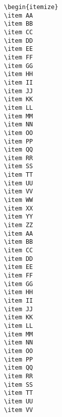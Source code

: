 \documentclass{article}
\begin{document}
\newcommand{\twoline}{\noindent\makebox[\linewidth]{\rule{\textwidth}{0.4pt}}\\}

\begin{verbatim}
\begin{itemize}
\item AA
\item BB
\item CC
\item DD
\item EE
\item FF
\item GG
\item HH
\item II
\item JJ
\item KK
\item LL
\item MM
\item NN
\item OO
\item PP
\item QQ
\item RR
\item SS
\item TT
\item UU
\item VV
\item WW
\item XX
\item YY
\item ZZ
\item AA
\item BB
\item CC
\item DD
\item EE
\item FF
\item GG
\item HH
\item II
\item JJ
\item KK
\item LL
\item MM
\item NN
\item OO
\item PP
\item QQ
\item RR
\item SS
\item TT
\item UU
\item VV

\end{verbatim}
\end{document}
